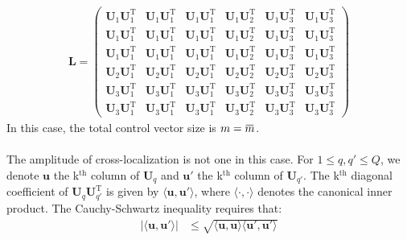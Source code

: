 \documentclass[12pt]{scrartcl}
\newcommand{\overbar}[1]{\mkern 1.5mu\overline{\mkern-1.5mu#1\mkern-1.5mu}\mkern 1.5mu}
\begin{document}
\begin{align}
\mathbf{L} = \left( \begin{array}{ccc|c|cc}
\mathbf{U}_1 \mathbf{U}_1^\mathrm{T} & \mathbf{U}_1 \mathbf{U}_1^\mathrm{T} & \mathbf{U}_1 \mathbf{U}_1^\mathrm{T} & \mathbf{U}_1 \mathbf{U}_2^\mathrm{T} & \mathbf{U}_1 \mathbf{U}_3^\mathrm{T} & \mathbf{U}_1 \mathbf{U}_3^\mathrm{T} \\
\mathbf{U}_1 \mathbf{U}_1^\mathrm{T} & \mathbf{U}_1 \mathbf{U}_1^\mathrm{T} & \mathbf{U}_1 \mathbf{U}_1^\mathrm{T} & \mathbf{U}_1 \mathbf{U}_2^\mathrm{T} & \mathbf{U}_1 \mathbf{U}_3^\mathrm{T} & \mathbf{U}_1 \mathbf{U}_3^\mathrm{T} \\
\mathbf{U}_1 \mathbf{U}_1^\mathrm{T} & \mathbf{U}_1 \mathbf{U}_1^\mathrm{T} & \mathbf{U}_1 \mathbf{U}_1^\mathrm{T} & \mathbf{U}_1 \mathbf{U}_2^\mathrm{T} & \mathbf{U}_1 \mathbf{U}_3^\mathrm{T} & \mathbf{U}_1 \mathbf{U}_3^\mathrm{T} \\[0.3ex]
\hline
\mathbf{U}_2 \mathbf{U}_1^\mathrm{T} & \mathbf{U}_2 \mathbf{U}_1^\mathrm{T} & \mathbf{U}_2 \mathbf{U}_1^\mathrm{T} & \mathbf{U}_2 \mathbf{U}_2^\mathrm{T} & \mathbf{U}_2 \mathbf{U}_3^\mathrm{T} & \mathbf{U}_2 \mathbf{U}_3^\mathrm{T} \\[0.3ex]
\hline
\mathbf{U}_3 \mathbf{U}_1^\mathrm{T} & \mathbf{U}_3 \mathbf{U}_1^\mathrm{T} & \mathbf{U}_3 \mathbf{U}_1^\mathrm{T} & \mathbf{U}_3 \mathbf{U}_2^\mathrm{T} & \mathbf{U}_3 \mathbf{U}_3^\mathrm{T} & \mathbf{U}_3 \mathbf{U}_3^\mathrm{T} \\
\mathbf{U}_3 \mathbf{U}_1^\mathrm{T} & \mathbf{U}_3 \mathbf{U}_1^\mathrm{T} & \mathbf{U}_3 \mathbf{U}_1^\mathrm{T} & \mathbf{U}_3 \mathbf{U}_2^\mathrm{T} & \mathbf{U}_3 \mathbf{U}_3^\mathrm{T} & \mathbf{U}_3 \mathbf{U}_3^\mathrm{T}
\end{array} \right)
\end{align}
In this case, the total control vector size is $\displaystyle m = \overbar{m}$.\\
$  $\\
The amplitude of cross-localization is not one in this case. For $1 \le q,q' \le Q$, we denote $\mathbf{u}$ the k$^\textrm{th}$ column of $\mathbf{U}_q$ and $\mathbf{u}'$ the k$^\textrm{th}$ column of $\mathbf{U}_{q'}$. The k$^\textrm{th}$ diagonal coefficient of $\mathbf{U}_q \mathbf{U}_{q'}^\mathrm{T}$ is given by $\langle \mathbf{u},\mathbf{u}' \rangle$, where $\langle \cdot, \cdot \rangle$ denotes the canonical inner product. The Cauchy-Schwartz inequality requires that:
\begin{align}
\vert \langle \mathbf{u},\mathbf{u}' \rangle \vert & \le \sqrt{\langle \mathbf{u},\mathbf{u} \rangle \langle \mathbf{u}',\mathbf{u}' \rangle}
\end{align}
\end{document}
